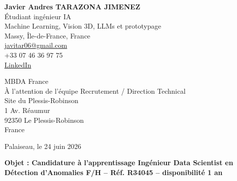 \documentclass[10pt,a4paper]{article}
\begin{document}
\begin{minipage}[t]{0.48\textwidth}
\textbf{\large Javier Andres TARAZONA JIMENEZ}\\
Étudiant ingénieur IA \\
Machine Learning, Vision 3D, LLMs et prototypage \\
Massy, Île-de-France, France\\
\href{mailto:javitar06@gmail.com}{javitar06@gmail.com}\\
+33 07 46 36 97 75\\
\href{https://www.linkedin.com/in/javier-andres-tarazona-jimenez-84b489222/}{LinkedIn}
\end{minipage}
\hfill
\begin{minipage}[t]{0.42\textwidth}
\raggedleft
MBDA France \\
À l’attention de l’équipe Recrutement / Direction Technical \\
Site du Plessis-Robinson \\
1 Av. Réaumur \\
92350 Le Plessis-Robinson \\
France \\
\end{minipage}

\vspace{1.1cm}

\raggedleft
Palaiseau, le 24 juin 2026

\vspace{0.7cm}

\raggedright
\textbf{Objet : Candidature à l’apprentissage Ingénieur Data Scientist en Détection d’Anomalies F/H – Réf. R34045 – disponibilité 1 an}

\vspace{0.5cm}
\end{document}
